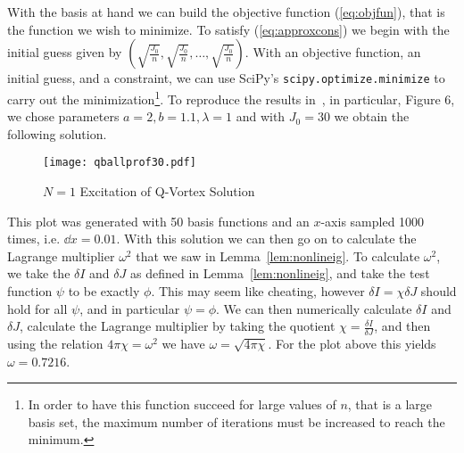 With the basis at hand we can build the objective function (\ref{eq:objfun}),
that is the function we wish to minimize. To satisfy (\ref{eq:approxcons}) we
begin with the initial guess given by \(\left(\sqrt{\frac{J_0}{n}}, \sqrt{\frac{J_0}{n}}, \ldots, \sqrt{\frac{J_0}{n}}\right)\).
With an objective function, an initial guess, and a constraint, we can use
SciPy's \texttt{scipy.optimize.minimize} to carry out the
minimization\footnote{In order to have this function succeed for large values of
\(n\), that is a large basis set, the maximum number of iterations must be
increased to reach the minimum.}. To reproduce the results in~\cite{spinningq},
in particular, Figure 6, we chose parameters \(a = 2, b = 1.1, \lambda = 1\) and
with \(J_0 = 30\) we obtain the following solution.
\begin{figure}[H]
    \centering
    \texttt{[image: qballprof30.pdf]}
    \caption{\(N = 1\) Excitation of Q-Vortex Solution}\label{fig:profile30}
\end{figure}
This plot was generated with 50 basis functions and an \(x\)-axis sampled 1000
times, i.e. \(\dd{x} = 0.01\). With this solution we can then go on to calculate
the Lagrange multiplier \(\omega^2\) that we saw in Lemma~\ref{lem:nonlineig}.
To calculate \(\omega^2\), we take the \(\delta I\) and \(\delta J\) as defined
in Lemma~\ref{lem:nonlineig}, and take the test function \(\psi\) to be exactly
\(\phi\). This may seem like cheating, however \(\delta I = \chi\delta J\)
should hold for all \(\psi\), and in particular \(\psi = \phi\). We can then
numerically calculate \(\delta I\) and \(\delta J\), calculate the Lagrange
multiplier by taking the quotient \(\chi = \frac{\delta I}{\delta J}\), and then
using the relation \(4\pi\chi = \omega^2\) we have \(\omega = \sqrt{4\pi\chi}\).
For the plot above this yields \(\omega = 0.7216\).

